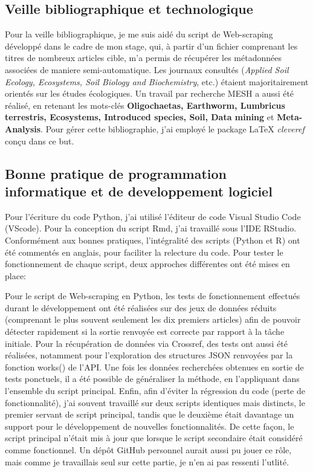 \documentclass{book}
\begin{document}
\subsection{Veille bibliographique et technologique}
\noindent
Pour la veille bibliographique, je me suis aidé du script de Web-scraping développé dans le cadre de mon stage, qui, à partir d'un fichier comprenant les titres de nombreux articles cible, m'a permis de récupérer les métadonnées associées de maniere semi-automatique. Les journaux consultés (\textit{Applied Soil Ecology, Ecosystems, Soil Biology and Biochemistry}, etc.) étaient majoritairement orientés sur les études écologiques. Un travail par recherche MESH a aussi été réalisé, en retenant les mots-clés \textbf{Oligochaetas, Earthworm, Lumbricus terrestris, Ecosystems, Introduced species, Soil, Data mining} et \textbf{Meta-Analysis}. Pour gérer cette bibliographie, j'ai employé le package LaTeX \textit{cleveref} conçu dans ce but.

\subsection[Bonnes pratiques]{Bonne pratique de programmation informatique et
    de developpement logiciel}
\noindent
Pour l'écriture du code Python, j'ai utilisé l'éditeur de code Visual Studio Code (VScode). Pour la conception du script Rmd, j'ai travaillé sous l'IDE RStudio. Conformément aux bonnes pratiques, l'intégralité des scripts (Python et R) ont été commentés en anglais, pour faciliter la relecture du code. Pour tester le fonctionnement de chaque script, deux approches différentes ont été mises en place: 

Pour le script de Web-scraping en Python, les tests de fonctionnement effectués durant le développement ont été réalisées sur des jeux de données réduits (comprenant le plus souvent seulement les dix premiers articles) afin de pouvoir détecter rapidement si la sortie renvoyée est correcte par rapport à la tâche initiale. Pour la récupération de données via Crossref, des tests ont aussi été réalisées, notamment pour l'exploration des structures JSON renvoyées par la fonction works() de l'API. Une fois les données recherchées obtenues en sortie de tests ponctuels, il a été possible de généraliser la méthode, en l'appliquant dans l'ensemble du script principal. Enfin, afin d'éviter la régression du code (perte de fonctionnalité), j'ai souvent travaillé sur deux scripts identiques mais distincts, le premier servant de script principal, tandis que le deuxième était davantage un support pour le développement de nouvelles fonctionnalités. De cette façon, le script principal n'était mis à jour que lorsque le script secondaire était considéré comme fonctionnel. Un dépôt GitHub personnel aurait aussi pu jouer ce rôle, mais comme je travaillais seul sur cette partie, je n'en ai pas ressenti l'utlité.
    
\end{document}
